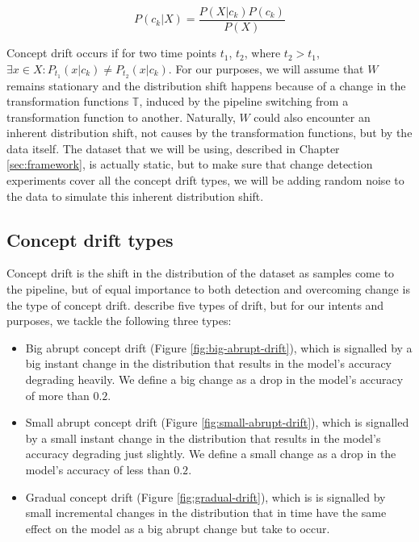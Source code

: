 \documentclass[12pt]{extreport}
\begin{document}
\begin{equation}
    P(c_k|X) = \frac{P(X|c_k) P(c_k)}{P(X)}
\end{equation}

Concept drift occurs if for two time points $t_1$, $t_2$, where $t_2 > t_1$, $\exists x \in X: P_{t_1}(x|c_k) \neq P_{t_2}(x|c_k)$. For our purposes, we will assume that $W$ remains stationary and the distribution shift happens because of a change in the transformation functions $\mathbb{T}$, induced by the pipeline switching from a transformation function to another. Naturally, $W$ could also encounter an inherent distribution shift, not causes by the transformation functions, but by the data itself. The dataset that we will be using, described in Chapter \ref{sec:framework}, is actually static, but to make sure that change detection experiments cover all the concept drift types, we will be adding random noise to the data to simulate this inherent distribution shift.

\subsection{Concept drift types}

Concept drift is the shift in the distribution of the dataset as samples come to the pipeline, but of equal importance to both detection and overcoming change is the type of concept drift. \cite{survey-concept-drift} describe five types of drift, but for our intents and purposes, we tackle the following three types:

\begin{itemize}
    \item Big abrupt concept drift (Figure \ref{fig:big-abrupt-drift}), which is signalled by a big instant change in the distribution that results in the model's accuracy degrading heavily. We define a big change as a drop in the model's accuracy of more than $0.2$.
    \item Small abrupt concept drift (Figure \ref{fig:small-abrupt-drift}), which is signalled by a small instant change in the distribution that results in the model's accuracy degrading just slightly. We define a small change as a drop in the model's accuracy of less than $0.2$.
    \item Gradual concept drift (Figure \ref{fig:gradual-drift}), which is is signalled by small incremental changes in the distribution that in time have the same effect on the model as a big abrupt change but take to occur.
\end{itemize}
\end{document}
